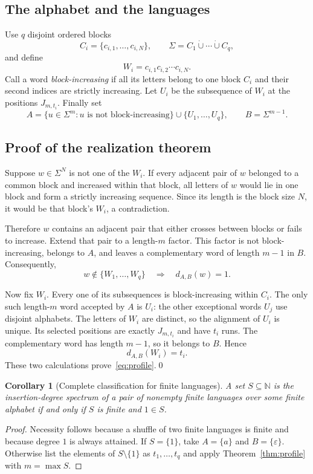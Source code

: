\documentclass[11pt,letterpaper]{article}
\newtheorem{corollary}[theorem]{Corollary}
\theoremstyle{definition}\newtheorem{definition}[theorem]{Definition}
\theoremstyle{remark}\newtheorem{remark}[theorem]{Remark}
\theoremstyle{definition}\newtheorem{question}[theorem]{Question}
\newcommand{\N}{\mathbb N}
\newcommand{\eps}{\varepsilon}
\begin{document}
\subsection{The alphabet and the languages}

Use $q$ disjoint ordered blocks
\[
 C_i=\{c_{i,1},\ldots,c_{i,N}\},\qquad
 \Sigma=C_1\mathbin{\dot\cup}\cdots\mathbin{\dot\cup}C_q,
\]
and define
\[
 W_i=c_{i,1}c_{i,2}\cdots c_{i,N}.
\]
Call a word \emph{block-increasing} if all its letters belong to one block $C_i$ and their second indices are strictly increasing. Let $U_i$ be the subsequence of $W_i$ at the positions $J_{m,t_i}$. Finally set
\begin{equation}
 A=\{u\in\Sigma^m:u\text{ is not block-increasing}\}
   \cup\{U_1,\ldots,U_q\},
 \qquad B=\Sigma^{m-1}.
 \label{eq:profile-construction}
\end{equation}

\subsection{Proof of the realization theorem}

Suppose $w\in\Sigma^N$ is not one of the $W_i$. If every adjacent pair of $w$ belonged to a common block and increased within that block, all letters of $w$ would lie in one block and form a strictly increasing sequence. Since its length is the block size $N$, it would be that block's $W_i$, a contradiction.

Therefore $w$ contains an adjacent pair that either crosses between blocks or fails to increase. Extend that pair to a length-$m$ factor. This factor is not block-increasing, belongs to $A$, and leaves a complementary word of length $m-1$ in $B$. Consequently,
\[
 w\notin\{W_1,\ldots,W_q\}\quad\Longrightarrow\quad d_{A,B}(w)=1.
\]

Now fix $W_i$. Every one of its subsequences is block-increasing within $C_i$. The only such length-$m$ word accepted by $A$ is $U_i$: the other exceptional words $U_j$ use disjoint alphabets. The letters of $W_i$ are distinct, so the alignment of $U_i$ is unique. Its selected positions are exactly $J_{m,t_i}$ and have $t_i$ runs. The complementary word has length $m-1$, so it belongs to $B$. Hence
\[
 d_{A,B}(W_i)=t_i.
\]
These two calculations prove~\eqref{eq:profile}.\qed

\begin{corollary}[Complete classification for finite languages]\label{cor:classification}
A set $S\subseteq\N$ is the insertion-degree spectrum of a pair of nonempty finite languages over some finite alphabet if and only if $S$ is finite and $1\in S$.
\end{corollary}
\begin{proof}
Necessity follows because a shuffle of two finite languages is finite and because degree $1$ is always attained. If $S=\{1\}$, take $A=\{a\}$ and $B=\{\eps\}$. Otherwise list the elements of $S\setminus\{1\}$ as $t_1,\ldots,t_q$ and apply Theorem~\ref{thm:profile} with $m=\max S$.
\end{proof}
\end{document}
